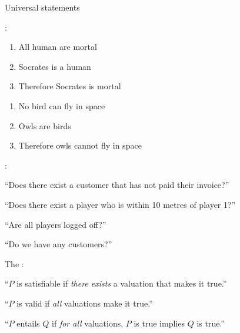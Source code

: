 \documentclass[xetex,aspectratio=169,14pt,hyperref={pdfpagelabels=true,pdflang={en-GB}}]{beamer}
\begin{document}
\begin{frame}[t]
  {Universal statements}

  \bigskip

  : \qquad {}

  \bigskip

  \begin{enumerate}
  \item All human are mortal
  \item Socrates is a human
  \item Therefore Socrates is mortal
  \end{enumerate}

  \bigskip

  \begin{enumerate}
  \item No bird can fly in space
  \item Owls are birds
  \item Therefore owls cannot fly in space
  \end{enumerate}
\end{frame}

\begin{frame}[t]

  \bigskip

  :

  \bigskip

  ``Does there exist a customer that has not paid their invoice?''

  \bigskip

  ``Does there exist a player who is within 10 metres of player 1?''

  \bigskip

  ``Are all players logged off?''

  \bigskip

  ``Do we have any customers?''
\end{frame}

\begin{frame}[t]

  \bigskip

  The :

  \bigskip

  ``$P$ is satisfiable if \emph{there exists} a valuation that makes it true.''

  \bigskip

  ``$P$ is valid if \emph{all} valuations make it true.''

  \bigskip

  ``$P$ entails $Q$ if \emph{for all} valuations, $P$ is true implies $Q$ is true.''

\end{frame}
\end{document}

